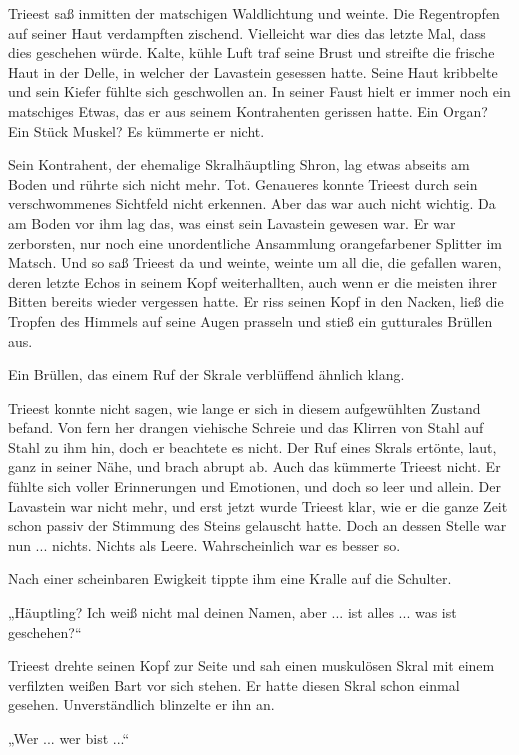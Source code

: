 Trieest saß inmitten der matschigen Waldlichtung und weinte. Die Regentropfen auf seiner Haut verdampften zischend. Vielleicht war dies das letzte Mal, dass dies geschehen würde. Kalte, kühle Luft traf seine Brust und streifte die frische Haut in der Delle, in welcher der Lavastein gesessen hatte. Seine Haut kribbelte und sein Kiefer fühlte sich geschwollen an. In seiner Faust hielt er immer noch ein matschiges Etwas, das er aus seinem Kontrahenten gerissen hatte. Ein Organ? Ein Stück Muskel? Es kümmerte er nicht.

Sein Kontrahent, der ehemalige Skralhäuptling Shron, lag etwas abseits am Boden und rührte sich nicht mehr. Tot. Genaueres konnte Trieest durch sein verschwommenes Sichtfeld nicht erkennen. Aber das war auch nicht wichtig. Da am Boden vor ihm lag das, was einst sein Lavastein gewesen war. Er war zerborsten, nur noch eine unordentliche Ansammlung orangefarbener Splitter im Matsch. Und so saß Trieest da und weinte, weinte um all die, die gefallen waren, deren letzte Echos in seinem Kopf weiterhallten, auch wenn er die meisten ihrer Bitten bereits wieder vergessen hatte. Er riss seinen Kopf in den Nacken, ließ die Tropfen des Himmels auf seine Augen prasseln und stieß ein gutturales Brüllen aus.

Ein Brüllen, das einem Ruf der Skrale verblüffend ähnlich klang.

Trieest konnte nicht sagen, wie lange er sich in diesem aufgewühlten Zustand befand. Von fern her drangen viehische Schreie und das Klirren von Stahl auf Stahl zu ihm hin, doch er beachtete es nicht. Der Ruf eines Skrals ertönte, laut, ganz in seiner Nähe, und brach abrupt ab. Auch das kümmerte Trieest nicht. Er fühlte sich voller Erinnerungen und Emotionen, und doch so leer und allein. Der Lavastein war nicht mehr, und erst jetzt wurde Trieest klar, wie er die ganze Zeit schon passiv der Stimmung des Steins gelauscht hatte. Doch an dessen Stelle war nun ... nichts. Nichts als Leere. Wahrscheinlich war es besser so.

Nach einer scheinbaren Ewigkeit tippte ihm eine Kralle auf die Schulter.

„Häuptling? Ich weiß nicht mal deinen Namen, aber ... ist alles ... was ist geschehen?“

Trieest drehte seinen Kopf zur Seite und sah einen muskulösen Skral mit einem verfilzten weißen Bart vor sich stehen. Er hatte diesen Skral schon einmal gesehen. Unverständlich blinzelte er ihn an.

„Wer ... wer bist ...“

